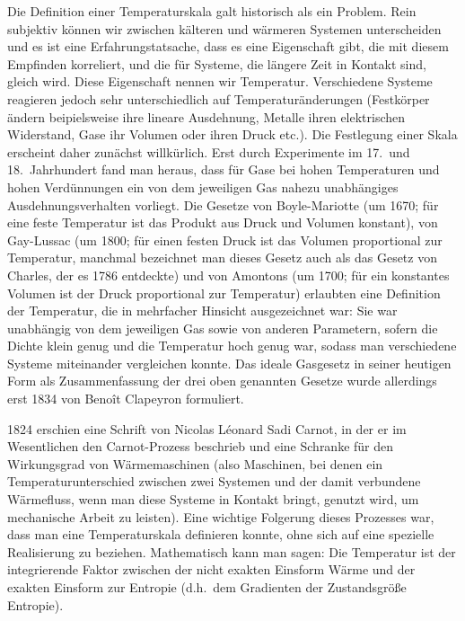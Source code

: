 Die Definition einer Temperaturskala galt historisch als ein Problem. Rein
subjektiv k\"onnen wir zwischen k\"alteren und w\"armeren Systemen unterscheiden und
es ist eine Erfahrungstatsache, dass es eine Eigenschaft gibt, die mit diesem Empfinden
korreliert, und die f\"ur Systeme, die l\"angere Zeit in Kontakt sind, gleich wird. Diese Eigenschaft
nennen wir Temperatur. 
Verschiedene Systeme reagieren jedoch sehr unterschiedlich auf
Temperatur\"anderungen (Festk\"orper \"andern beipielsweise ihre lineare Ausdehnung, Metalle ihren
elektrischen Widerstand, Gase ihr Volumen oder ihren Druck etc.). Die Festlegung einer Skala erscheint daher
zun\"achst willk\"urlich. Erst durch Experimente im 17.\ und 18.\ Jahrhundert fand man heraus,
dass f\"ur Gase bei hohen Temperaturen und hohen Verd\"unnungen ein von dem jeweiligen Gas
nahezu unabh\"angiges Ausdehnungsverhalten vorliegt. Die Gesetze von 
Boyle-Mariotte (um 1670; f\"ur eine
feste Temperatur ist das Produkt aus Druck und Volumen konstant), 
von Gay-Lussac 
(um 1800; f\"ur einen festen Druck ist das Volumen proportional zur Temperatur, manchmal bezeichnet
man dieses Gesetz auch als das Gesetz von Charles, der es 1786 entdeckte) 
und von Amontons
(um 1700; f\"ur ein konstantes Volumen ist der Druck proportional zur Temperatur) erlaubten eine
Definition der Temperatur, die in mehrfacher Hinsicht ausgezeichnet war: Sie war unabh\"angig
von dem jeweiligen Gas sowie von anderen Parametern, sofern die Dichte klein genug und
die Temperatur hoch genug war, sodass man verschiedene Systeme miteinander vergleichen 
konnte. Das ideale Gasgesetz in seiner heutigen Form als Zusammenfassung der drei oben genannten
Gesetze wurde allerdings erst 1834 von Beno\^{i}t Clapeyron formuliert. 

1824 erschien eine Schrift von 
Nicolas L\'{e}onard Sadi Carnot, in der er im Wesentlichen den
Carnot-Prozess beschrieb und eine Schranke f\"ur den Wirkungsgrad von W\"armemaschinen
(also Maschinen, bei denen ein Temperaturunterschied zwischen zwei Systemen und der
damit verbundene W\"armefluss, wenn man diese Systeme in Kontakt bringt, genutzt wird, um 
mechanische Arbeit zu leisten). Eine wichtige Folgerung dieses Prozesses war, dass
man eine Temperaturskala definieren konnte, ohne sich auf eine spezielle Realisierung zu
beziehen. Mathematisch kann man sagen: Die Temperatur ist der integrierende Faktor
zwischen der nicht exakten Einsform W\"arme und der exakten Einsform zur Entropie 
(d.h.\ dem Gradienten der Zustandsgr\"o\ss e Entropie).  

